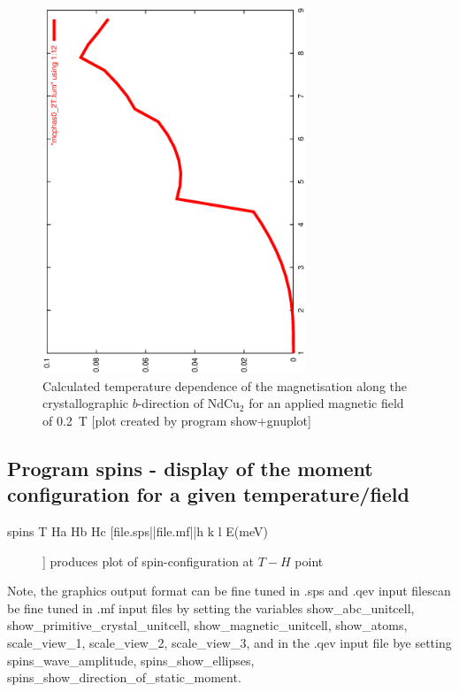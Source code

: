 \begin{figure}[hb]%
\begin{center}\leavevmode
\includegraphics[angle=-90, width=0.7\textwidth]{../examples/ndcu2b/resultss/mag0_2T.ps}
\end{center}
\caption{Calculated temperature dependence of the magnetisation  along the crystallographic
$b$-direction  of NdCu$_2$ for an applied magnetic field of 0.2~T 
[plot created by program {\prg show+gnuplot}]}
\label{magnetizationgraphic}
\end{figure}


\subsection{Program {\prg spins} - display of the moment configuration for a given %
temperature/field}
\label{spins}

\begin{description} 
\item [spins T Ha Hb Hc [file.sps||file.mf||h k l E(meV)]]       produces plot of spin-configuration at $T-H$ %
point
\end{description} 

Note, the graphics output format can be fine tuned in .sps and .qev input filescan be fine tuned in .mf input %
files by setting the variables
{\prg show\_abc\_unitcell, show\_primitive\_crystal\_unitcell, show\_magnetic\_unitcell, show\_atoms, %
scale\_view\_1,
scale\_view\_2, scale\_view\_3}, and in
the  .qev input file bye setting 
{\prg spins\_wave\_amplitude, spins\_show\_ellipses, spins\_show\_direction\_of\_static\_moment}.

